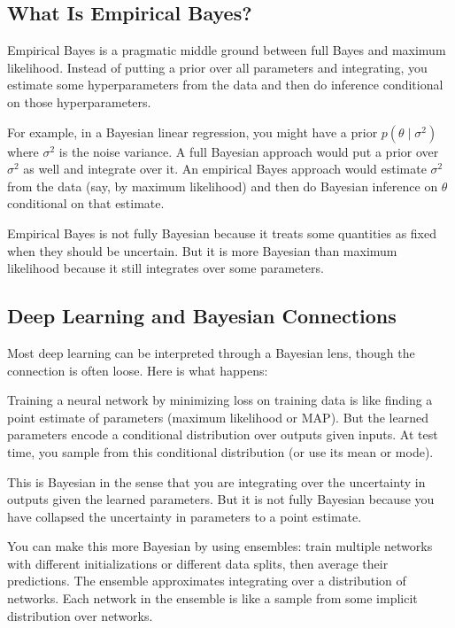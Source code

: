 \subsection{What Is Empirical Bayes?}

Empirical Bayes is a pragmatic middle ground between full Bayes and maximum likelihood. Instead of putting a prior over all parameters and integrating, you estimate some hyperparameters from the data and then do inference conditional on those hyperparameters.

For example, in a Bayesian linear regression, you might have a prior $p(\theta \mid \sigma^2)$ where $\sigma^2$ is the noise variance. A full Bayesian approach would put a prior over $\sigma^2$ as well and integrate over it. An empirical Bayes approach would estimate $\sigma^2$ from the data (say, by maximum likelihood) and then do Bayesian inference on $\theta$ conditional on that estimate.

Empirical Bayes is not fully Bayesian because it treats some quantities as fixed when they should be uncertain. But it is more Bayesian than maximum likelihood because it still integrates over some parameters.

\subsection{Deep Learning and Bayesian Connections}

Most deep learning can be interpreted through a Bayesian lens, though the connection is often loose. Here is what happens:

Training a neural network by minimizing loss on training data is like finding a point estimate of parameters (maximum likelihood or MAP). But the learned parameters encode a conditional distribution over outputs given inputs. At test time, you sample from this conditional distribution (or use its mean or mode).

This is Bayesian in the sense that you are integrating over the uncertainty in outputs given the learned parameters. But it is not fully Bayesian because you have collapsed the uncertainty in parameters to a point estimate.

You can make this more Bayesian by using ensembles: train multiple networks with different initializations or different data splits, then average their predictions. The ensemble approximates integrating over a distribution of networks. Each network in the ensemble is like a sample from some implicit distribution over networks.

